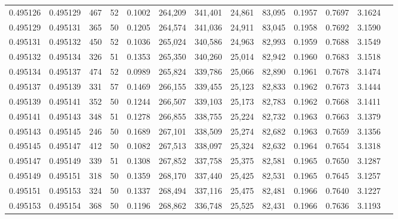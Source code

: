 \begin{tabular}{rrrrrrrrrrrrr}
0.495126 & 0.495129 &   467 &  52 &                                     0.1002 & 264,209 & 341,401 &  24,861 &  83,095 & 0.1957 & 0.7697 & 3.1624 \\
0.495129 & 0.495131 &   365 &  50 &                                     0.1205 & 264,574 & 341,036 &  24,911 &  83,045 & 0.1958 & 0.7692 & 3.1590 \\
0.495131 & 0.495132 &   450 &  52 &                                     0.1036 & 265,024 & 340,586 &  24,963 &  82,993 & 0.1959 & 0.7688 & 3.1549 \\
0.495132 & 0.495134 &   326 &  51 &                                     0.1353 & 265,350 & 340,260 &  25,014 &  82,942 & 0.1960 & 0.7683 & 3.1518 \\
0.495134 & 0.495137 &   474 &  52 &                                     0.0989 & 265,824 & 339,786 &  25,066 &  82,890 & 0.1961 & 0.7678 & 3.1474 \\
0.495137 & 0.495139 &   331 &  57 &                                     0.1469 & 266,155 & 339,455 &  25,123 &  82,833 & 0.1962 & 0.7673 & 3.1444 \\
0.495139 & 0.495141 &   352 &  50 &                                     0.1244 & 266,507 & 339,103 &  25,173 &  82,783 & 0.1962 & 0.7668 & 3.1411 \\
0.495141 & 0.495143 &   348 &  51 &                                     0.1278 & 266,855 & 338,755 &  25,224 &  82,732 & 0.1963 & 0.7663 & 3.1379 \\
0.495143 & 0.495145 &   246 &  50 &                                     0.1689 & 267,101 & 338,509 &  25,274 &  82,682 & 0.1963 & 0.7659 & 3.1356 \\
0.495145 & 0.495147 &   412 &  50 &                                     0.1082 & 267,513 & 338,097 &  25,324 &  82,632 & 0.1964 & 0.7654 & 3.1318 \\
0.495147 & 0.495149 &   339 &  51 &                                     0.1308 & 267,852 & 337,758 &  25,375 &  82,581 & 0.1965 & 0.7650 & 3.1287 \\
0.495149 & 0.495151 &   318 &  50 &                                     0.1359 & 268,170 & 337,440 &  25,425 &  82,531 & 0.1965 & 0.7645 & 3.1257 \\
0.495151 & 0.495153 &   324 &  50 &                                     0.1337 & 268,494 & 337,116 &  25,475 &  82,481 & 0.1966 & 0.7640 & 3.1227 \\
0.495153 & 0.495154 &   368 &  50 &                                     0.1196 & 268,862 & 336,748 &  25,525 &  82,431 & 0.1966 & 0.7636 & 3.1193 \\

\end{tabular}
